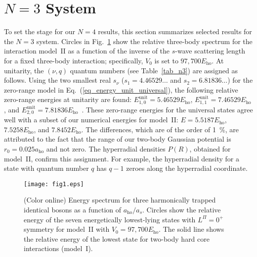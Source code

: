 \documentclass[aps,pra,twocolumn,showpacs,superscriptaddress]{revtex4}
\begin{document}
\section{$N=3$ System}
\label{sec_n3}
To set the stage for our $N=4$ results,
this section summarizes selected results
for the $N=3$ system.
Circles in Fig.~\ref{fig_energy_n3}
show the relative three-body spectrum for the
interaction model~II as a function of the inverse of the 
$s$-wave scattering length for a fixed three-body interaction;
specifically, $V_0$ is set to $97,700 E_{\text{ho}}$.
At unitarity,
the 
$(\nu,q)$ quantum numbers (see Table~\ref{tab_n3}) 
are assigned as follows.
Using the two smallest real $s_{\nu}$ 
($s_{1}=4.46529\dots$ and $s_2=6.81836 \dots$)
for the zero-range model in Eq.~(\ref{eq_energy_unit_universal}),
the following relative zero-range energies at unitarity are found:
$E_{1,0}^{\text{unit}}= 5.46529 E_{\text{ho}}$,
$E_{1,1}^{\text{unit}}= 7.46529 E_{\text{ho}}$, and
$E_{2,0}^{\text{unit}}= 7.81836 E_{\text{ho}}$~\cite{wernerPRL2006}.
These zero-range energies for the universal states
agree well with a subset of our numerical energies for 
model~II:
$E=5.5187 E_{\text{ho}}$, $7.5258 E_{\text{ho}}$, and $7.8452 E_{\text{ho}}$.
The differences, which are of the order
of 1~\%, are attributed to the fact that the range
of our two-body Gaussian potential is $r_0=0.025 a_{\text{ho}}$ and not
zero.
The  hyperradial densities $P(R)$, obtained for model~II,
confirm this assignment.
For example, the hyperradial density for
a state with quantum number  $q$ has $q-1$ zeroes along the hyperradial
coordinate.


\begin{figure}[t]
  \vspace*{0.6in}
  \hspace*{0.1in}
\centering
\texttt{[image: fig1.eps]}
\vspace*{.6in}
\caption{(Color online)
Energy spectrum for three harmonically
trapped identical bosons as a function of $a_{\text{ho}}/a_s$.
Circles show the relative energy of the seven energetically lowest-lying states 
with $L^{\Pi}=0^+$ symmetry 
for model~II with 
$V_0=97,700 E_{\text{ho}}$.
The solid line shows the relative energy of the lowest
state for two-body hard core interactions (model~I).
}\label{fig_energy_n3}
\end{figure}
\end{document}
